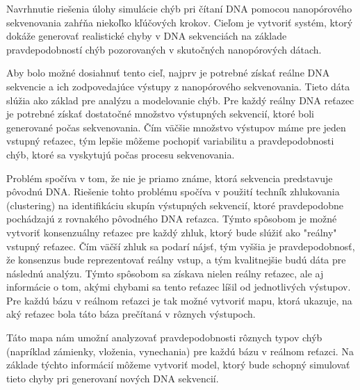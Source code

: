 

Navrhnutie riešenia úlohy simulácie chýb pri čítaní DNA pomocou nanopórového sekvenovania zahŕňa niekoľko kľúčových krokov.
Cieľom je vytvoriť systém, ktorý dokáže generovať realistické chyby v DNA sekvenciách na základe pravdepodobností chýb pozorovaných v skutočných nanopórových dátach.

Aby bolo možné dosiahnuť tento cieľ, najprv je potrebné získať reálne DNA sekvencie a ich zodpovedajúce výstupy z nanopórového sekvenovania. Tieto dáta slúžia ako základ pre analýzu a modelovanie chýb.
Pre každý reálny DNA reťazec je potrebné získať dostatočné množstvo výstupných sekvencií, ktoré boli generované počas sekvenovania. Čím väčšie množstvo výstupov máme pre jeden vstupný reťazec, tým lepšie môžeme pochopiť variabilitu a pravdepodobnosti chýb, ktoré sa vyskytujú počas procesu sekvenovania.

Problém spočíva v tom, že nie je priamo známe, ktorá sekvencia predstavuje pôvodnú DNA.
Riešenie tohto problému spočíva v použití techník zhlukovania (clustering) na identifikáciu skupín výstupných sekvencií, ktoré pravdepodobne pochádzajú z rovnakého pôvodného DNA reťazca. Týmto spôsobom je možné vytvoriť konsenzuálny reťazec pre každý zhluk, ktorý bude slúžiť ako "reálny" vstupný reťazec.
Čím väčší zhluk sa podarí nájsť, tým vyššia je pravdepodobnosť, že konsenzus bude reprezentovať reálny vstup, a tým kvalitnejšie budú dáta pre následnú analýzu.
Týmto spôsobom sa získava nielen reálny reťazec, ale aj informácie o tom, akými chybami sa tento reťazec líšil od jednotlivých výstupov. Pre každú bázu v reálnom reťazci je tak možné vytvoriť mapu, ktorá ukazuje, na aký reťazec bola táto báza prečítaná v rôznych výstupoch.

Táto mapa nám umožní analyzovať pravdepodobnosti rôznych typov chýb (napríklad zámienky, vloženia, vynechania) pre každú bázu v reálnom reťazci. Na základe týchto informácií môžeme vytvoriť model, ktorý bude schopný simulovať tieto chyby pri generovaní nových DNA sekvencií.